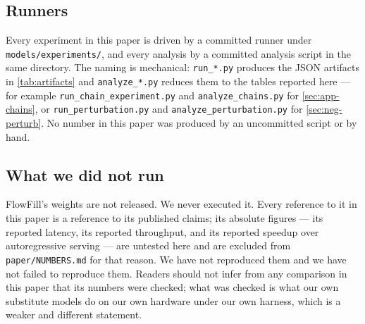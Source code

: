 \subsection{Runners}

Every experiment in this paper is driven by a committed runner under
\texttt{models/experiments/}, and every analysis by a committed analysis script
in the same directory. The naming is mechanical: \texttt{run\_*.py} produces the
JSON artifacts in \cref{tab:artifacts} and \texttt{analyze\_*.py} reduces them to
the tables reported here --- for example \texttt{run\_chain\_experiment.py} and
\texttt{analyze\_chains.py} for \cref{sec:app-chains}, or
\texttt{run\_perturbation.py} and \texttt{analyze\_perturbation.py} for
\cref{sec:neg-perturb}. No number in this paper was produced by an
uncommitted script or by hand.

\subsection{What we did not run}

FlowFill's weights are not released. We never executed it. Every reference to it
in this paper is a reference to its published claims; its absolute figures ---
its reported latency, its reported throughput, and its reported speedup over
autoregressive serving --- are untested here and are excluded from
\texttt{paper/NUMBERS.md} for that reason. We have not reproduced them and we
have not failed to reproduce them. Readers should not infer from any comparison
in this paper that its numbers were checked; what was checked is what our own
substitute models do on our own hardware under our own harness, which is a
weaker and different statement.
